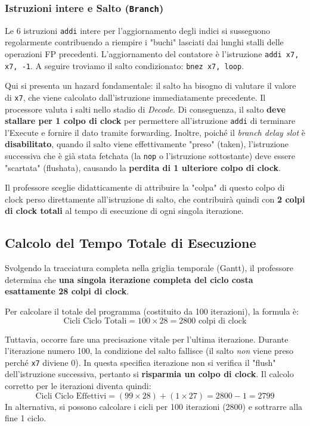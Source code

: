 \subsubsection{Istruzioni intere e Salto (\texttt{Branch})}
Le 6 istruzioni \texttt{addi} intere per l'aggiornamento degli indici si susseguono regolarmente contribuendo a riempire i "buchi" lasciati dai lunghi stalli delle operazioni FP precedenti.
L'aggiornamento del contatore è l'istruzione \texttt{addi x7, x7, -1}.
A seguire troviamo il salto condizionato: \texttt{bnez x7, loop}.

Qui si presenta un hazard fondamentale: il salto ha bisogno di valutare il valore di \texttt{x7}, che viene calcolato dall'istruzione immediatamente precedente. Il processore valuta i salti nello stadio di \textit{Decode}. Di conseguenza, il salto \textbf{deve stallare per 1 colpo di clock} per permettere all'istruzione \texttt{addi} di terminare l'Execute e fornire il dato tramite forwarding.
Inoltre, poiché il \textit{branch delay slot} è \textbf{disabilitato}, quando il salto viene effettivamente "preso" (taken), l'istruzione successiva che è già stata fetchata (la \texttt{nop} o l'istruzione sottostante) deve essere "scartata" (flushata), causando la \textbf{perdita di 1 ulteriore colpo di clock}. 

Il professore sceglie didatticamente di attribuire la "colpa" di questo colpo di clock perso direttamente all'istruzione di salto, che contribuirà quindi con \textbf{2 colpi di clock totali} al tempo di esecuzione di ogni singola iterazione.

\subsection{Calcolo del Tempo Totale di Esecuzione}
Svolgendo la tracciatura completa nella griglia temporale (Gantt), il professore determina che \textbf{una singola iterazione completa del ciclo costa esattamente 28 colpi di clock}.

Per calcolare il totale del programma (costituito da 100 iterazioni), la formula è:
\[ \text{Cicli Ciclo Totali} = 100 \times 28 = 2800 \text{ colpi di clock} \]

Tuttavia, occorre fare una precisazione vitale per l'ultima iterazione. Durante l'iterazione numero 100, la condizione del salto fallisce (il salto \textit{non} viene preso perché \texttt{x7} diviene 0). In questa specifica iterazione non si verifica il "flush" dell'istruzione successiva, pertanto si \textbf{risparmia un colpo di clock}.
Il calcolo corretto per le iterazioni diventa quindi:
\[ \text{Cicli Ciclo Effettivi} = (99 \times 28) + (1 \times 27) = 2800 - 1 = 2799 \]
In alternativa, si possono calcolare i cicli per 100 iterazioni (2800) e sottrarre alla fine 1 ciclo.

